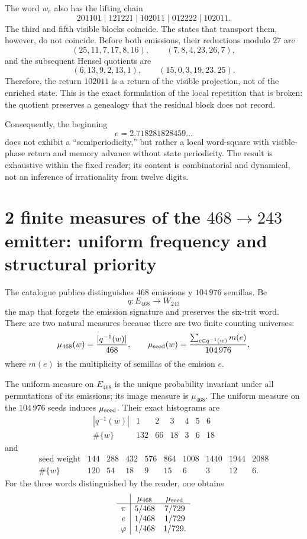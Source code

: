 The word \(w_e\) also has the lifting chain
\[
201101\mid121221\mid102011\mid012222\mid102011.
\]
The third and fifth visible blocks coincide. The states that transport them,
however, do not coincide. Before both emissions, their reductions
modulo \(27\) are
\[
(25,11,7,17,8,16),
\qquad
(7,8,4,23,26,7),
\]
and the subsequent Hensel quotients are
\[
(6,13,9,2,13,1),
\qquad
(15,0,3,19,23,25).
\]
Therefore, the return \(102011\) is a return of the visible projection, not
of the enriched state. This is the exact formulation of the local repetition
that is broken: the quotient preserves a genealogy that the residual block does not
record.

Consequently, the beginning
\[
e=2.718281828459\ldots
\]
does not exhibit a ``semiperiodicity,'' but rather a local word-square with
visible-phase return and memory advance without state periodicity. The result is exhaustive within the
fixed reader; its content is combinatorial and dynamical, not an inference of
irrationality from twelve digits.

\section[2 finite measures of the emitter 468 a 243]{2 finite measures of the \texorpdfstring{\(468\to243\)}{468→243} emitter: uniform frequency and structural priority}

The catalogue publico distinguishes \(468\) emissions y \(104\,976\) semillas.
Be
\[
 q:E_{468}\longrightarrow W_{243}
\]
the map that forgets the emission signature and preserves the six-trit
word. There are two natural measures because there are two finite counting universes:
\[
 \mu_{468}(w)=\frac{|q^{-1}(w)|}{468},
 \qquad
 \mu_{\rm seed}(w)=
 \frac{\sum_{e\in q^{-1}(w)}m(e)}{104\,976},
\]
where \(m(e)\) is the multiplicity of semillas of the emision \(e\).

\begin{theorem}
\label{thm:medidas-emisor-468}
The uniform measure on \(E_{468}\) is the unique probability invariant under
all permutations of its emissions; its image measure is \(\mu_{468}\).
The uniform measure on the \(104\,976\) seeds induces
\(\mu_{\rm seed}\). Their exact histograms are
\[
\begin{array}{c|rrrrrr}
|q^{-1}(w)|&1&2&3&4&5&6\\ \hline
\#\{w\}&132&66&18&3&6&18
\end{array}
\]
and
\[
\begin{array}{c|rrrrrrrrr}
\text{seed weight}
&144&288&432&576&864&1008&1440&1944&2088\\ \hline
\#\{w\}
&120&54&18&9&15&6&3&12&6.
\end{array}
\]
For the three words distinguished by the reader, one obtains
\[
\begin{array}{c|cc}
&\mu_{468}&\mu_{\rm seed}\\ \hline
\pi&5/468&7/729\\
e&1/468&1/729\\
\varphi&1/468&1/729.
\end{array}
\]
\end{theorem}

